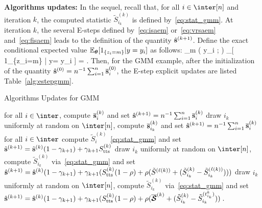 \documentclass[12pt]{article}
\begin{document}
\noindent \textbf{Algorithms updates:}
In the sequel, recall that, for all $i \in \inter[n]$ and iteration $k$, the computed statistic $ \tilde{S}_{i_k}^{(k)}$ is defined by~\eqref{eq:stat_gmm}.
At iteration $k$, the several E-steps defined by~\eqref{eq:isaem} or~\eqref{eq:vrsaem} and~\eqref{eq:fisaem} leads to the definition of the quantity $\hat{{\mathbf{s}}}^{(k+1)} $. 
Define the exact conditional expected value $\mathbb{E}_{{\bm{\theta}}}[ 1_{\{z_i=m\}} | y= y_{i} ]$ as follows:
\beq \notag
\widetilde{\omega}_m ( y_{i} ; \param ) \eqdef \EE_{\param}[ 1_{\{z_i=m\}} | y= y_{i} ]
=  \eqsp.
\eeq
Then, for the GMM example, after the initialization of the quantity $\hat{{\mathbf{s}}}^{(0)} = n^{-1} \sum\nolimits_{i=1}^n \overline{{\mathbf{s}}}_i^{(0)} $, the E-step explicit updates are listed Table~\ref{alg:estepgmm}.

 \begin{protocol}[H]
\caption{Algorithms Updates for GMM}\label{alg:estepgmm}
  \begin{algorithmic}[1]
 \hspace{0.4cm} for all $i \in \inter$, compute $\overline{{\mathbf{s}}}_{i}^{(k)}$ and set $\hat{{\mathbf{s}}}^{(k+1)} = n^{-1} \sum\nolimits_{i=1}^n \overline{{\mathbf{s}}}_i^{(k)}$
 \hspace{0.4cm} draw  $i_k$ uniformly at random on $\inter[n]$, compute $\overline{{\mathbf{s}}}_{i_k}^{(k)}$ and set $\hat{{\mathbf{s}}}^{(k+1)} = n^{-1} \sum\nolimits_{i=1}^n \overline{{\mathbf{s}}}_i^{(k)}$
 \hspace{0.4cm} for all $i \in \inter$ compute $ \tilde{S}_{i}^{(k)}$~\eqref{eq:stat_gmm} and set  $\hat{{\mathbf{s}}}^{(k+1)} = \hat{{\mathbf{s}}}^{(k)}(1 - \gamma_{k+1}) + \gamma_{k+1}S_{\textrm{tts}}^{(k)}$
 \hspace{0.4cm} draw  $i_k$ uniformly at random on $\inter[n]$, compute $ \tilde{S}_{i_k}^{(k)}$ via~\eqref{eq:stat_gmm} and set $\hat{{\mathbf{s}}}^{(k+1)} = \hat{{\mathbf{s}}}^{(k)}(1 - \gamma_{k+1})+ \gamma_{k+1} (S_{\textrm{tts}}^{(k)} (1 - \rho) + \rho (\tilde{S}^{(\ell(k))} +  ( \tilde{S}_{i_k}^{(k)}  -\tilde{S}_{i_k}^{(\ell(k))}   )) ) $
 \hspace{0.4cm} draw  $i_k$ uniformly at random on $\inter[n]$, compute $ \tilde{S}_{i_k}^{(k)}$ via~\eqref{eq:stat_gmm} and set $ \hat{{\mathbf{s}}}^{(k+1)} = \hat{{\mathbf{s}}}^{(k)}(1 - \gamma_{k+1})+ \gamma_{k+1} (S_{\textrm{tts}}^{(k)} (1 - \rho) + \rho (\overline{{\bm{\mathcal{S}}}}^{(k)} + ( \tilde{S}_{i_k}^{(k)}  - \tilde{S}_{i_k}^{(t_{i_k}^k)}) ) \;.$
  \end{algorithmic}
\end{protocol}
\end{document}
